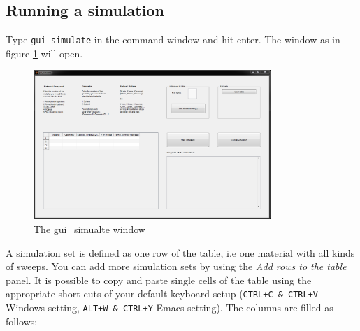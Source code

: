 		\subsection{Running a simulation} \label{sec:RunSim}
			Type \lstinline{gui_simulate}  in the \matlab command window and hit enter. The window as in figure \ref{fig:gui_simulate} will open.
			\begin{figure}[htbp]
				\centering
				\includegraphics[width=0.8\textwidth]{Fig/Scrn_gui_simulate.png}
				\caption{The gui\_simualte window}
				\label{fig:gui_simulate}
			\end{figure}
			A simulation set is defined as one row of the table, i.e one material with all kinds of sweeps. You can add more simulation sets
			by using the {\it Add rows to the table} panel.
			It is possible to copy and paste single cells of the table using the appropriate short cuts of your \matlab default keyboard setup
			(\lstinline{CTRL+C & CTRL+V} Windows setting, \lstinline{ALT+W & CTRL+Y} Emacs setting).
			The columns are filled as follows:
